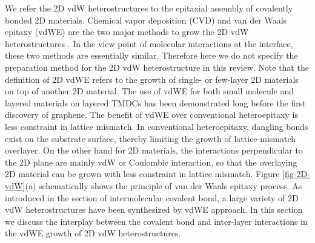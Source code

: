 We refer the 2D vdW heterostructures to the epitaxial assembly of
covalently bonded 2D materials. Chemical vapor deposition (CVD) and
van der Waals epitaxy (vdWE) are the two major methods to grow the 2D
vdW heterostructures \cite{Novoselov_2016_vdW}. In the view point of
molecular interactions at the interface, these two methods are
essentially similar. Therefore here we do not specify the preparation
method for the 2D vdW heterostructure in this review. Note that the
definition of 2D vdWE refers to the growth of single- or few-layer 2D
materials on top of another 2D material. The use of vdWE for both
small molecule \cite{Hara_1989_cupc_mos2_vdwe,Sakurai_1991_c60_mos2} and
layered materials
\cite{Koma_1985_vdWE,Ueno_1990_vdWE,Ohuchi_1990_MoSe2_SnS2,Parkinson_1991_vdWE}
on layered TMDCs has been demonstrated long before the first discovery
of graphene. The benefit of vdWE over conventional heteroepitaxy is
less constraint in lattice mismatch. In conventional heteroepitaxy,
dangling bonds exist on the substrate surface, thereby limiting the
growth of lattice-mismatch overlayer. On the other hand for 2D
materials, the interactions perpendicular to the 2D plane are mainly
vdW or Coulombic interaction, so that the overlaying 2D material can
be grown with less constraint in lattice mismatch. Figure
\ref{fig-2D-vdW}(a) schematically shows the principle of van der Waals
epitaxy process.  As introduced in the section of intermolecular
covalent bond, a large variety of 2D vdW heterostructures have been
synthesized by vdWE approach. In this section we discuss the interplay
between the covalent bond and inter-layer interactions in the vdWE
growth of 2D vdW heterostructures.

